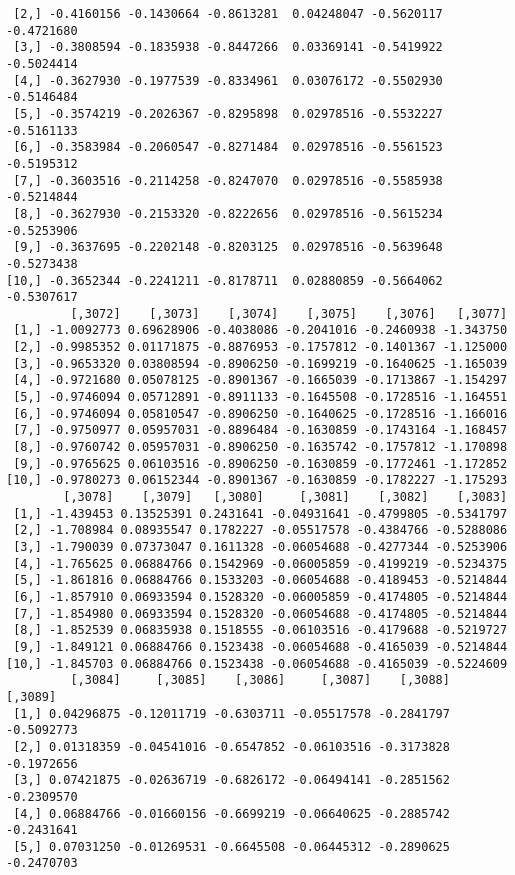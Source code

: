 \documentclass[
  letterpaper,
  DIV=11,
  numbers=noendperiod]{scrreprt}
\begin{document}
\begin{verbatim}
 [2,] -0.4160156 -0.1430664 -0.8613281  0.04248047 -0.5620117 -0.4721680
 [3,] -0.3808594 -0.1835938 -0.8447266  0.03369141 -0.5419922 -0.5024414
 [4,] -0.3627930 -0.1977539 -0.8334961  0.03076172 -0.5502930 -0.5146484
 [5,] -0.3574219 -0.2026367 -0.8295898  0.02978516 -0.5532227 -0.5161133
 [6,] -0.3583984 -0.2060547 -0.8271484  0.02978516 -0.5561523 -0.5195312
 [7,] -0.3603516 -0.2114258 -0.8247070  0.02978516 -0.5585938 -0.5214844
 [8,] -0.3627930 -0.2153320 -0.8222656  0.02978516 -0.5615234 -0.5253906
 [9,] -0.3637695 -0.2202148 -0.8203125  0.02978516 -0.5639648 -0.5273438
[10,] -0.3652344 -0.2241211 -0.8178711  0.02880859 -0.5664062 -0.5307617
         [,3072]    [,3073]    [,3074]    [,3075]    [,3076]   [,3077]
 [1,] -1.0092773 0.69628906 -0.4038086 -0.2041016 -0.2460938 -1.343750
 [2,] -0.9985352 0.01171875 -0.8876953 -0.1757812 -0.1401367 -1.125000
 [3,] -0.9653320 0.03808594 -0.8906250 -0.1699219 -0.1640625 -1.165039
 [4,] -0.9721680 0.05078125 -0.8901367 -0.1665039 -0.1713867 -1.154297
 [5,] -0.9746094 0.05712891 -0.8911133 -0.1645508 -0.1728516 -1.164551
 [6,] -0.9746094 0.05810547 -0.8906250 -0.1640625 -0.1728516 -1.166016
 [7,] -0.9750977 0.05957031 -0.8896484 -0.1630859 -0.1743164 -1.168457
 [8,] -0.9760742 0.05957031 -0.8906250 -0.1635742 -0.1757812 -1.170898
 [9,] -0.9765625 0.06103516 -0.8906250 -0.1630859 -0.1772461 -1.172852
[10,] -0.9780273 0.06152344 -0.8901367 -0.1630859 -0.1782227 -1.175293
        [,3078]    [,3079]   [,3080]     [,3081]    [,3082]    [,3083]
 [1,] -1.439453 0.13525391 0.2431641 -0.04931641 -0.4799805 -0.5341797
 [2,] -1.708984 0.08935547 0.1782227 -0.05517578 -0.4384766 -0.5288086
 [3,] -1.790039 0.07373047 0.1611328 -0.06054688 -0.4277344 -0.5253906
 [4,] -1.765625 0.06884766 0.1542969 -0.06005859 -0.4199219 -0.5234375
 [5,] -1.861816 0.06884766 0.1533203 -0.06054688 -0.4189453 -0.5214844
 [6,] -1.857910 0.06933594 0.1528320 -0.06005859 -0.4174805 -0.5214844
 [7,] -1.854980 0.06933594 0.1528320 -0.06054688 -0.4174805 -0.5214844
 [8,] -1.852539 0.06835938 0.1518555 -0.06103516 -0.4179688 -0.5219727
 [9,] -1.849121 0.06884766 0.1523438 -0.06054688 -0.4165039 -0.5214844
[10,] -1.845703 0.06884766 0.1523438 -0.06054688 -0.4165039 -0.5224609
         [,3084]     [,3085]    [,3086]     [,3087]    [,3088]    [,3089]
 [1,] 0.04296875 -0.12011719 -0.6303711 -0.05517578 -0.2841797 -0.5092773
 [2,] 0.01318359 -0.04541016 -0.6547852 -0.06103516 -0.3173828 -0.1972656
 [3,] 0.07421875 -0.02636719 -0.6826172 -0.06494141 -0.2851562 -0.2309570
 [4,] 0.06884766 -0.01660156 -0.6699219 -0.06640625 -0.2885742 -0.2431641
 [5,] 0.07031250 -0.01269531 -0.6645508 -0.06445312 -0.2890625 -0.2470703

\end{verbatim}
\end{document}
